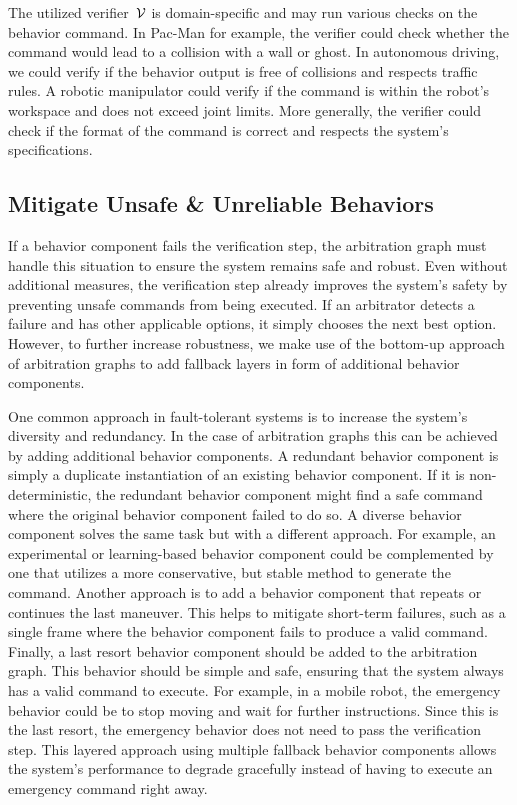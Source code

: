 The utilized verifier~$\mathcal{V}$ is domain-specific and may run various checks on the behavior command.
In Pac-Man for example, the verifier could check whether the command would lead to a collision with a wall or ghost.
In autonomous driving, we could verify if the behavior output is free of collisions and respects traffic rules.
A robotic manipulator could verify if the command is within the robot's workspace and does not exceed joint limits.
More generally, the verifier could check if the format of the command is correct and respects the system's specifications.

\subsection{Mitigate Unsafe \& Unreliable Behaviors}
If a behavior component fails the verification step, the arbitration graph must handle this situation to ensure the system remains safe and robust.
Even without additional measures, the verification step already improves the system's safety by preventing unsafe commands from being executed.
If an arbitrator detects a failure and has other applicable options, it simply chooses the next best option.
%
However, to further increase robustness, we make use of the bottom-up approach of arbitration graphs to add fallback layers in form of additional behavior components.

One common approach in fault-tolerant systems is to increase the system's diversity and redundancy.
In the case of arbitration graphs this can be achieved by adding additional behavior components.
A redundant behavior component is simply a duplicate instantiation of an existing behavior component.
If it is non-deterministic, the redundant behavior component might find a safe command where the original behavior component failed to do so.
A diverse behavior component solves the same task but with a different approach.
For example, an experimental or learning-based behavior component could be complemented by one that utilizes a more conservative, but stable method to generate the command.
% 
Another approach is to add a behavior component that repeats or continues the last maneuver.
This helps to mitigate short-term failures, such as a single frame where the behavior component fails to produce a valid command.
%
Finally, a last resort behavior component should be added to the arbitration graph.
This behavior should be simple and safe, ensuring that the system always has a valid command to execute.
For example, in a mobile robot, the emergency behavior could be to stop moving and wait for further instructions.
Since this is the last resort, the emergency behavior does not need to pass the verification step.
%
This layered approach using multiple fallback behavior components allows the system's performance to degrade gracefully instead of having to execute an emergency command right away.

